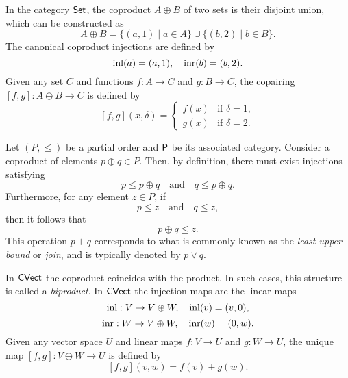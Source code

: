 \begin{example}
  In the category $\mathsf{Set}$, the coproduct \( A \oplus B \) of two sets is their disjoint union, which can be constructed as
\[
A \oplus B = \{(a, 1) \mid a \in A\} \cup \{(b, 2) \mid b \in B\}.
\]
The canonical coproduct injections are defined by
\[
\mathrm{inl}(a) = (a, 1), \quad \mathrm{inr}(b) = (b, 2).
\]
Given any set \(C\) and functions \(f: A \to C\) and \(g: B \to C\), the copairing \([f, g]: A \oplus B \to C\) is defined by
\[
[f, g](x, \delta) = 
\begin{cases}
f(x) & \text{if } \delta = 1, \\
g(x) & \text{if } \delta = 2.
\end{cases}
\]
\end{example}

\begin{example}
  Let $(P, \leq)$ be a partial order and $\mathsf{P}$ be its associated category.  
Consider a coproduct of elements \( p \oplus q \in P \). Then, by definition, there must exist injections satisfying
\[
p \leq p \oplus q \quad \text{and} \quad q \leq p \oplus q.
\]
Furthermore, for any element \( z \in P \), if
\[
p \leq z \quad \text{and} \quad q \leq z,
\]
then it follows that
\[
p \oplus q \leq z.
\]
This operation \( p + q \) corresponds to what is commonly known as the \emph{least upper bound} or \emph{join}, and is typically denoted by \( p \vee q \).
\end{example}


\begin{example}
  In $\mathsf{CVect}$ the coproduct coincides with the product. In such cases, this structure is called a \emph{biproduct}. 
  In  $\mathsf{CVect}$ the injection maps are the linear maps
\[
\mathrm{inl}: V \to  V \oplus W, \quad  \mathrm{inl}(v)= (v,0),
\]
\[
\mathrm{inr} : W \to V \oplus W, \quad \mathrm{inr}(w) = (0,w).
\]
Given any vector space $U$ and linear maps $f: V \to U$ and $g: W \to U$, the unique map $[ f, g] : V \oplus W \to U$
is defined by
\[
[f, g] (v,w) = f(v)+ g(w).
\]
\end{example}



